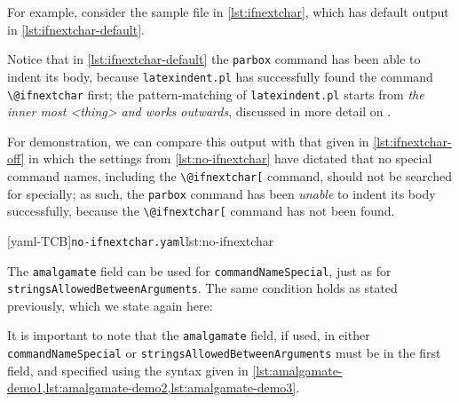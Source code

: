  \begin{example}
 For example, consider the sample file in \cref{lst:ifnextchar}, which has default output
 in \cref{lst:ifnextchar-default}.

 \begin{cmhtcbraster}[raster column skip=.1\linewidth]
 \end{cmhtcbraster}

 Notice that in \cref{lst:ifnextchar-default} the \texttt{parbox} command has been able to
 indent its body, because \texttt{latexindent.pl} has successfully found the command
 \lstinline!\@ifnextchar! first; the pattern-matching of \texttt{latexindent.pl} starts
 from \emph{the inner most <thing> and works outwards}, discussed in more detail on
 .

 For demonstration, we can compare this output with that given in
 \cref{lst:ifnextchar-off} in which the settings from \cref{lst:no-ifnextchar} have
 dictated that no special command names, including the \lstinline!\@ifnextchar[! command,
 should not be searched for specially; as such, the \texttt{parbox} command has been
 \emph{unable} to indent its body successfully, because the \lstinline!\@ifnextchar[!
 command has not been found.

 \begin{cmhtcbraster}[raster column skip=.1\linewidth]
  [yaml-TCB]{\texttt{no-ifnextchar.yaml}}{lst:no-ifnextchar}
 \end{cmhtcbraster}
 \end{example}

 The \texttt{amalgamate} field can be used for \texttt{commandNameSpecial}, just as for
 \texttt{stringsAllowedBetweenArguments}. The same condition holds as stated previously,
 which we state again here: 

 \begin{warning}
  It is important to note that the \texttt{amalgamate} field, if used, in either
  \texttt{commandNameSpecial} or \texttt{stringsAllowedBetweenArguments} must be in the
  first field, and specified using the syntax given in
  \cref{lst:amalgamate-demo1,lst:amalgamate-demo2,lst:amalgamate-demo3}.
 \end{warning}
